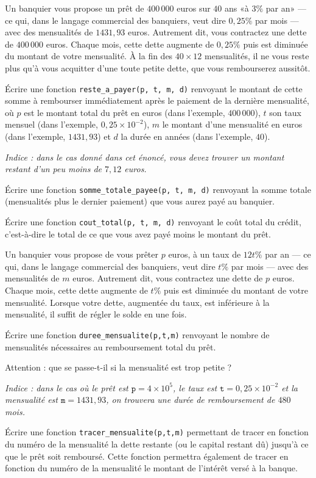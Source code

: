 \exer{}
\setcounter{numques}{0}

Un banquier vous  propose un prêt de $400\,000$ euros  sur $40$ ans «à
$3\%$ par  an» ---  ce qui, dans  le langage commercial  des banquiers,
veut  dire $0,25\%$  par mois  ---  avec des  mensualités de  $1431,93$
euros.  Autrement  dit,  vous   contractez  une  dette  de  $400\,000$
euros. Chaque mois, cette dette  augmente de $0,25\%$ puis est diminuée
du  montant  de  votre  mensualité.  À  la  fin  des  $40  \times  12$
mensualités, il  ne vous  reste plus qu'à  vous acquitter  d'une toute
petite dette, que vous rembourserez aussitôt.


\question{} Écrire  une fonction  \texttt{reste\_a\_payer(p, t,  m, d)}
renvoyant  le montant  de cette  somme à  rembourser  immédiatement
après le paiement de la dernière
mensualité, où  $p$ est le  montant total du  prêt en euros (dans l'exemple, $400\,000$), $t$ son  taux mensuel (dans l'exemple, 
$0,25 \times 10^{-2}$), $m$ le montant d'une mensualité en euros (dans l'exemple, $1431,93$) et $d$ la
durée en années (dans l'exemple, $40$).

\emph{Indice : dans le cas donné dans cet énoncé, vous devez trouver un montant
restant d'un peu moins de $7,12$ euros.}


\question{} Écrire une fonction \texttt{somme\_totale\_payee(p, t, m,
  d)} renvoyant la somme totale (mensualités plus le dernier
paiement) que vous aurez payé au banquier.


\question{}Écrire une fonction \texttt{cout\_total(p, t, m, d)} renvoyant
  le coût total  du crédit, c'est-à-dire le total de  ce que vous avez
  payé moins le montant du prêt.
  
Un banquier vous propose de vous prêter $p$ euros, à un taux de $12t\%$ par an ---  ce qui, dans  le langage commercial  des banquiers,
veut  dire $t\%$  par mois  --- avec des  mensualités de  $m$ euros. Autrement  dit,  vous   contractez  une  dette  de  $p$
euros. Chaque mois, cette dette  augmente de $t\%$ puis est diminuée du  montant  de  votre  mensualité. Lorsque votre dette, augmentée du taux, est inférieure à la mensualité, il suffit de régler le solde en une fois.

\question{} \'Ecrire une fonction \texttt{duree\_mensualite(p,t,m)} renvoyant le nombre de mensualités nécessaires au remboursement total du prêt.

\question{} Attention : que se passe-t-il si la mensualité est trop petite ? 

\emph{Indice : dans le cas où le prêt est $\texttt{p}=4\times10^5$, le taux est $\texttt{t}=0,25\times10^{-2}$ et la mensualité est $\texttt{m}=1431,93$, on trouvera une durée de remboursement de $480$ mois.}

\question{} \'Ecrire une fonction \texttt{tracer\_mensualite(p,t,m)} permettant de tracer en fonction du numéro de la mensualité la dette restante (ou le capital restant dû) jusqu'à ce que le prêt soit remboursé. Cette fonction permettra également de tracer en fonction du numéro de la mensualité le montant de l'intérêt versé à la banque. 
